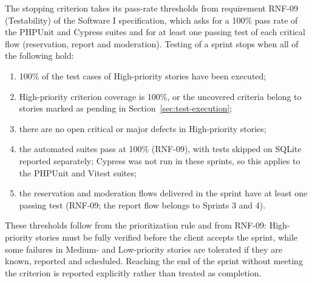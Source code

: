 The stopping criterion takes its pass-rate thresholds from requirement RNF-09 (Testability) of
the Software I specification, which asks for a 100\% pass rate of the PHPUnit and Cypress suites
and for at least one passing test of each critical flow (reservation, report and moderation).
Testing of a sprint stops when all of the following hold:

\begin{enumerate}
  \item 100\% of the test cases of High-priority stories have been executed;
  \item High-priority criterion coverage is 100\%, or the uncovered criteria belong to stories
        marked as pending in Section~\ref{sec:test-execution};
  \item there are no open critical or major defects in High-priority stories;
  \item the automated suites pass at 100\% (RNF-09), with tests skipped on SQLite reported
        separately; Cypress was not run in these sprints, so this applies to the PHPUnit and
        Vitest suites;
  \item the reservation and moderation flows delivered in the sprint have at least one passing
        test (RNF-09; the report flow belongs to Sprints 3 and 4).
\end{enumerate}

These thresholds follow from the prioritization rule and from RNF-09: High-priority stories must
be fully verified before the client accepts the sprint, while some failures in Medium- and
Low-priority stories are tolerated if they are known, reported and scheduled. Reaching the end of
the sprint without meeting the criterion is reported explicitly rather than treated as
completion.
